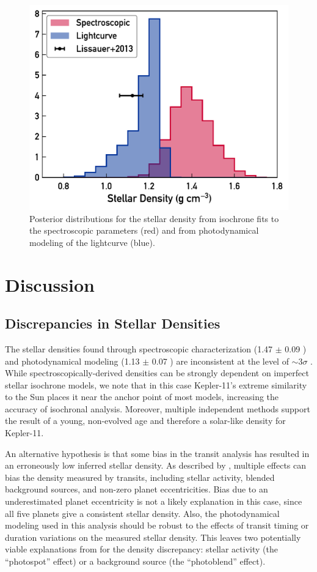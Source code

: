 \documentclass[oneside]{emulateapj}
\begin{document}
\begin{figure}
\centering
\includegraphics[width=\columnwidth]{density}
\caption{Posterior distributions for the stellar density from isochrone fits to the spectroscopic parameters (red) and from photodynamical modeling of the lightcurve (blue).}
\label{fig:densities}
\end{figure}


\section{Discussion}
\label{s:discussion}
\subsection{Discrepancies in Stellar Densities}

The stellar densities found through spectroscopic characterization (1.47 $\pm$ 0.09 \gcm) and photodynamical modeling (1.13 $\pm$ 0.07 \gcm) are inconsistent at the level of $\sim$3$\sigma$ . While spectroscopically-derived densities can be strongly dependent on imperfect stellar isochrone models, we note that in this case Kepler-11's extreme similarity to the Sun places it near the anchor point of most models, increasing the accuracy of isochronal analysis. Moreover, multiple independent methods support the result of a young, non-evolved age and therefore a solar-like density for Kepler-11.

An alternative hypothesis is that some bias in the transit analysis has resulted in an erroneously low inferred stellar density. As described by \citet{Kipping2014}, multiple effects can bias the density measured by transits, including stellar activity, blended background sources, and non-zero planet eccentricities. Bias due to an underestimated planet eccentricity is not a likely explanation in this case, since all five planets give a consistent stellar density. Also, the photodynamical modeling used in this analysis should be robust to the effects of transit timing or duration variations on the measured stellar density. This leaves two potentially viable explanations from \citet{Kipping2014} for the density discrepancy: stellar activity (the ``photospot'' effect) or a background source (the ``photoblend'' effect).
\end{document}
